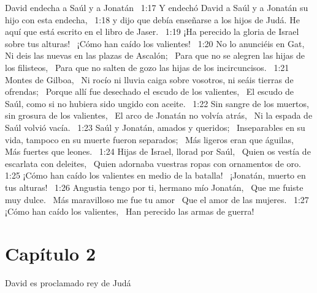 David endecha a Saúl y a Jonatán  
1:17 Y endechó David a Saúl y a Jonatán su hijo con esta endecha,  
1:18 y dijo que debía enseñarse a los hijos de Judá. He aquí que está escrito en el libro de Jaser.  
1:19 ¡Ha perecido la gloria de Israel sobre tus alturas!  
¡Cómo han caído los valientes!  
1:20 No lo anunciéis en Gat,  
Ni deis las nuevas en las plazas de Ascalón;  
Para que no se alegren las hijas de los filisteos,  
Para que no salten de gozo las hijas de los incircuncisos.  
1:21 Montes de Gilboa,  
Ni rocío ni lluvia caiga sobre vosotros, ni seáis tierras de ofrendas;  
Porque allí fue desechado el escudo de los valientes,  
El escudo de Saúl, como si no hubiera sido ungido con aceite.  
1:22 Sin sangre de los muertos, sin grosura de los valientes,  
El arco de Jonatán no volvía atrás,  
Ni la espada de Saúl volvió vacía.  
1:23 Saúl y Jonatán, amados y queridos;  
Inseparables en su vida, tampoco en su muerte fueron separados;  
Más ligeros eran que águilas,  
Más fuertes que leones.  
1:24 Hijas de Israel, llorad por Saúl,  
Quien os vestía de escarlata con deleites,  
Quien adornaba vuestras ropas con ornamentos de oro.  
1:25 ¡Cómo han caído los valientes en medio de la batalla!  
¡Jonatán, muerto en tus alturas!  
1:26 Angustia tengo por ti, hermano mío Jonatán,  
Que me fuiste muy dulce.  
Más maravilloso me fue tu amor  
Que el amor de las mujeres.  
1:27 ¡Cómo han caído los valientes,  
Han perecido las armas de guerra!  
\section*{Capítulo 2 }
David es proclamado rey de Judá  

